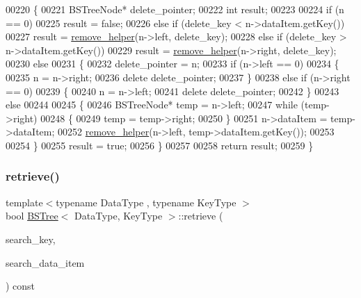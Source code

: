 \begin{DoxyCode}
00220 \{
00221     BSTreeNode* delete\_pointer; 
00222     \textcolor{keywordtype}{int} result;                 
00223 
00224     \textcolor{keywordflow}{if} (n == 0)
00225         result = \textcolor{keyword}{false};                           
00226     \textcolor{keywordflow}{else} \textcolor{keywordflow}{if} (delete\_key < n->dataItem.getKey())
00227         result = \hyperlink{class_b_s_tree_a4bd9d8e6357091ea72da7f62e2ee9577}{remove\_helper}(n->left, delete\_key);
00228     \textcolor{keywordflow}{else} \textcolor{keywordflow}{if} (delete\_key > n->dataItem.getKey())
00229         result = \hyperlink{class_b_s_tree_a4bd9d8e6357091ea72da7f62e2ee9577}{remove\_helper}(n->right, delete\_key);
00230     \textcolor{keywordflow}{else}
00231     \{                                            
00232         delete\_pointer = n;
00233         \textcolor{keywordflow}{if} (n->left == 0)
00234         \{
00235             n = n->right;                    
00236             \textcolor{keyword}{delete} delete\_pointer;
00237         \}
00238         \textcolor{keywordflow}{else} \textcolor{keywordflow}{if} (n->right == 0)
00239         \{
00240             n = n->left;                     
00241             \textcolor{keyword}{delete} delete\_pointer;
00242         \}
00243         \textcolor{keywordflow}{else}
00244             
00245         \{
00246             BSTreeNode* temp = n->left;
00247             \textcolor{keywordflow}{while} (temp->right) 
00248             \{
00249                 temp = temp->right;
00250             \}
00251             n->dataItem = temp->dataItem;
00252             \hyperlink{class_b_s_tree_a4bd9d8e6357091ea72da7f62e2ee9577}{remove\_helper}(n->left, temp->dataItem.getKey());
00253 
00254         \}
00255         result = \textcolor{keyword}{true};
00256     \}
00257 
00258     \textcolor{keywordflow}{return} result;
00259 \}
\end{DoxyCode}
\hypertarget{class_b_s_tree_a464aa205470b150038ff35dfa01d89b8}{}\label{class_b_s_tree_a464aa205470b150038ff35dfa01d89b8} 
\subsubsection{\texorpdfstring{retrieve()}{retrieve()}}
{\footnotesize\ttfamily template$<$typename Data\+Type , typename Key\+Type $>$ \\
bool \hyperlink{class_b_s_tree}{B\+S\+Tree}$<$ Data\+Type, Key\+Type $>$\+::retrieve (\begin{DoxyParamCaption}\item[{const Key\+Type \&}]{search\+\_\+key,  }\item[{Data\+Type \&}]{search\+\_\+data\+\_\+item }\end{DoxyParamCaption}) const}


